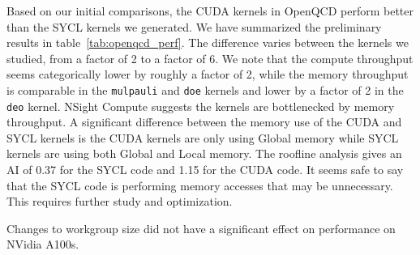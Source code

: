 \documentclass[../main]{subfiles}
\begin{document}
Based on our initial comparisons, the CUDA kernels in OpenQCD perform better than the SYCL kernels we generated.
We have summarized the preliminary results in table~\ref{tab:openqcd_perf}.
The difference varies between the kernels we studied, from a factor of 2 to a factor of 6.
We note that the compute throughput seems categorically lower by roughly a factor of 2, while the memory throughput is comparable in the \verb #mulpauli# and \verb #doe# kernels and lower by a factor of 2 in the \verb #deo# kernel.
NSight Compute suggests the kernels are bottlenecked by memory throughput.
A significant difference between the memory use of the CUDA and SYCL kernels is the CUDA kernels are only using Global memory while SYCL kernels are using both Global and Local memory.
The roofline analysis gives an AI of 0.37 for the SYCL code and 1.15 for the CUDA code.
It seems safe to say that the SYCL code is performing memory accesses that may be unnecessary.
This requires further study and optimization.

Changes to workgroup size did not have a significant effect on performance on NVidia A100s.
\end{document}
